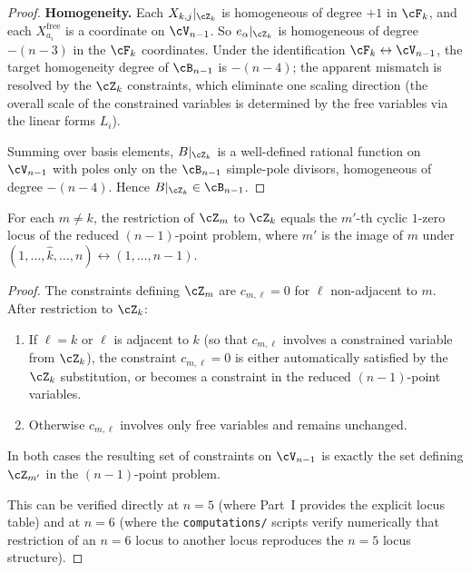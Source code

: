 \begin{proof}
\medskip\noindent\textbf{Homogeneity.}
Each $X_{k,j}|_{\cZ_k}$ is homogeneous of degree $+1$ in
$\cF_k$, and each $X_{a_i}^{\mathrm{free}}$ is a coordinate
on $\cV_{n-1}$. So $e_\alpha|_{\cZ_k}$ is homogeneous of
degree $-(n-3)$ in the $\cF_k$ coordinates. Under the
identification $\cF_k \leftrightarrow \cV_{n-1}$, the
target homogeneity degree of $\cB_{n-1}$ is $-(n-4)$; the
apparent mismatch is resolved by the $\cZ_k$ constraints,
which eliminate one scaling direction (the overall scale
of the constrained variables is determined by the free
variables via the linear forms $L_i$).

Summing over basis elements, $B|_{\cZ_k}$ is a well-defined
rational function on $\cV_{n-1}$ with poles only on the
$\cB_{n-1}$ simple-pole divisors, homogeneous of degree
$-(n-4)$. Hence $B|_{\cZ_k} \in \cB_{n-1}$.
\end{proof}

\begin{lemma}
\label{lem:inherited}
For each $m \neq k$, the restriction of $\cZ_m$ to $\cZ_k$
equals the $m'$-th cyclic $1$-zero locus of the reduced
$(n-1)$-point problem, where $m'$ is the image of $m$
under $(1,\ldots,\hat{k},\ldots,n)
\leftrightarrow (1,\ldots,n-1)$.
\end{lemma}

\begin{proof}
The constraints defining $\cZ_m$ are $c_{m,\ell} = 0$ for
$\ell$ non-adjacent to $m$. After restriction to $\cZ_k$:
\begin{enumerate}[label=(\roman*)]
  \item If $\ell = k$ or $\ell$ is adjacent to $k$ (so that
    $c_{m,\ell}$ involves a constrained variable from $\cZ_k$),
    the constraint $c_{m,\ell} = 0$ is either automatically
    satisfied by the $\cZ_k$ substitution, or becomes a
    constraint in the reduced $(n-1)$-point variables.
  \item Otherwise $c_{m,\ell}$ involves only free variables
    and remains unchanged.
\end{enumerate}
In both cases the resulting set of constraints on $\cV_{n-1}$
is exactly the set defining $\cZ_{m'}$ in the $(n-1)$-point
problem.

This can be verified directly at $n=5$ (where Part~I provides
the explicit locus table) and at $n=6$ (where the
\texttt{computations/} scripts verify numerically that
restriction of an $n=6$ locus to another locus reproduces
the $n=5$ locus structure).
\end{proof}

